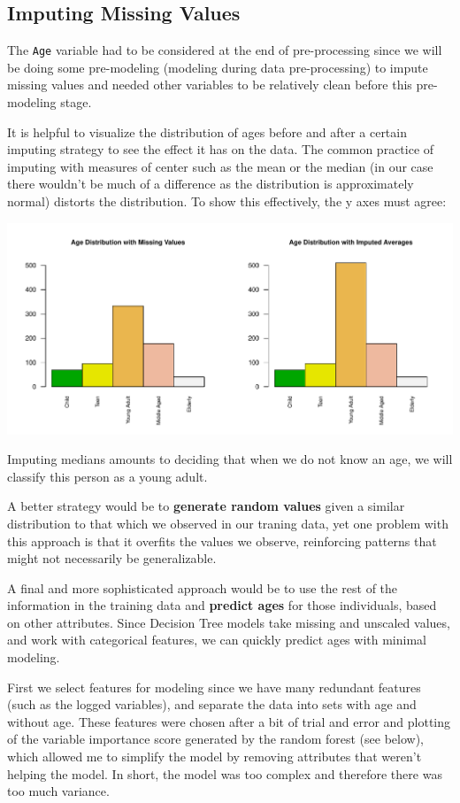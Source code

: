 \documentclass[]{article}
\begin{document}
\subsection{Imputing Missing Values}\label{imputing-missing-values}

The \texttt{Age} variable had to be considered at the end of
pre-processing since we will be doing some pre-modeling (modeling during
data pre-processing) to impute missing values and needed other variables
to be relatively clean before this pre-modeling stage.

It is helpful to visualize the distribution of ages before and after a
certain imputing strategy to see the effect it has on the data. The
common practice of imputing with measures of center such as the mean or
the median (in our case there wouldn't be much of a difference as the
distribution is approximately normal) distorts the distribution. To show
this effectively, the y axes must agree:

\includegraphics{Titanic_Survival_files/figure-latex/unnamed-chunk-21-1.pdf}

Imputing medians amounts to deciding that when we do not know an age, we
will classify this person as a young adult.

A better strategy would be to \textbf{generate random values} given a
similar distribution to that which we observed in our traning data, yet
one problem with this approach is that it overfits the values we
observe, reinforcing patterns that might not necessarily be
generalizable.

A final and more sophisticated approach would be to use the rest of the
information in the training data and \textbf{predict ages} for those
individuals, based on other attributes. Since Decision Tree models take
missing and unscaled values, and work with categorical features, we can
quickly predict ages with minimal modeling.

First we select features for modeling since we have many redundant
features (such as the logged variables), and separate the data into sets
with age and without age. These features were chosen after a bit of
trial and error and plotting of the variable importance score generated
by the random forest (see below), which allowed me to simplify the model
by removing attributes that weren't helping the model. In short, the
model was too complex and therefore there was too much variance.
\end{document}
